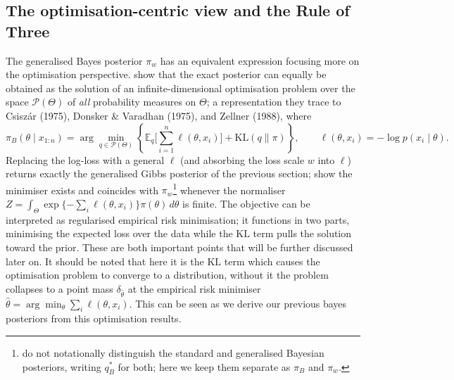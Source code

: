 \documentclass[mstat,12pt]{unswthesis}
\begin{document}
\subsection*{The optimisation-centric view and the Rule of Three}
The generalised Bayes posterior $\pi_w$ has an equivalent expression focusing more on the optimisation perspective. \citet{knoblauch2022optimization} show that the exact posterior can equally be obtained as the solution of an infinite-dimensional optimisation problem over the space $\mathcal{P}(\Theta)$ of \emph{all} probability measures on $\Theta$; a representation they trace to Csisz\'ar (1975), Donsker \& Varadhan (1975), and Zellner (1988), where
$$
    \pi_B(\theta \mid x_{1:n}) = \arg\min_{q \in \mathcal{P}(\Theta)} \left\{ \mathbb{E}_{q}\Big[\sum_{i=1}^{n} \ell(\theta, x_i)\Big] + \mathrm{KL}(q \| \pi) \right\}, \qquad \ell(\theta, x_i) = -\log p(x_i \mid \theta).
$$
Replacing the log-loss with a general $\ell$ (and absorbing the loss scale $w$ into $\ell$) returns exactly the generalised Gibbs posterior of the previous section; \citet{bissiri2016general} show the minimiser exists and coincides with $\pi_w$\footnote{\citet{knoblauch2022optimization} do not notationally distinguish the standard and generalised Bayesian posteriors, writing $q^\ast_B$ for both; here we keep them separate as $\pi_B$ and $\pi_w$.} whenever the normaliser $Z = \int_\Theta \exp\{-\sum_i \ell(\theta, x_i)\}\pi(\theta)\,d\theta$ is finite.
The objective can be interpreted as regularised empirical risk minimisation; it functions in two parts, minimising the expected loss over the data while the $\mathrm{KL}$ term pulls the solution toward the prior. These are both important points that will be further discussed later on.
It should be noted that here it is the $\mathrm{KL}$ term which causes the optimisation problem to converge to a distribution, without it the problem collapses to a point mass $\delta_{\hat\theta}$ at the empirical risk minimiser $\hat{\theta} = \arg\min_\theta \sum_i \ell(\theta, x_i)$. This can be seen as we derive our previous bayes posteriors from this optimisation results.
\end{document}
